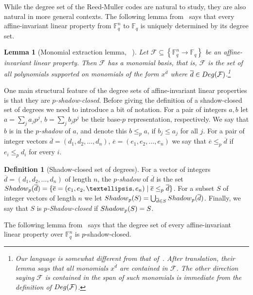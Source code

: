 \documentclass[10pt]{article}
\newtheorem{lemma}[theorem]{Lemma}
\theoremstyle{definition}
\newtheorem{definition}[theorem]{Definition}
\numberwithin{equation}{section}
\newcommand{\F}{{\mathbb{F}}}
\newcommand{\cF}{{\mathcal{F}}}
\newcommand{\set}[1]{\left\{{#1}\right\}}
\newcommand{\Shadow}{{\rm{Shadow}}}
\newcommand{\Deg}{{\rm{Deg}}}
\begin{document}
While the degree set of the Reed-Muller codes are natural to study, they
are also natural in more general contexts.
The following lemma from~\cite{KS08} says that every affine-invariant linear property from $\F_q^n$ to $\F_q$ is uniquely determined by its degree set.

\begin{lemma}[Monomial extraction lemma, {\protect~\cite[Lemma 4.2]{KS08-ECCC}}]\label{lem:monomial-extraction}
Let $\mathcal{F} \subseteq \set{\F_{q}^n \to \F_q}$ be an affine-invariant linear property. Then $\cF$ has a monomial basis, that is, $\cF$ is the set of
all polynomials supported on monomials of the form $x^{\overline d}$ where $\overline d  \in \Deg(\cF)$.\footnote{Our language is somewhat different from that of~\cite{KS08-ECCC}. After
translation, their lemma says that all monomials $x^{\overline d}$
are contained in $\cF$. The other direction saying $\cF$ is contained
in the span of such monomials is immediate from the definition of
$\Deg(\cF)$.}
\end{lemma}

One main structural feature of the degree sets of affine-invariant linear properties is that
they are \emph{$p$-shadow-closed}. Before giving the definition of a shadow-closed set of degrees we need to introduce a bit of notation.
For a pair of integers $a,b$ let
$a= \sum_j a_j p^j$, $b= \sum_j b_jp^j$ be their base-$p$ representation, respectively. We say that $b$ is in the \emph{$p$-shadow} of $a$, and denote this $b \leq_p a$, if $b_j \leq a_j$ for all $j$.
For a pair of integer vectors $ \overline d=(d_1,d_2,\ldots,d_n)$, $\overline e=(e_1,e_2,\ldots,e_n)$ we say that
$\overline e \leq_p  \overline d$ if
$e_i \leq_p d_i$ for every $i$.

\begin{definition}[Shadow-closed set of degrees]\label{defn:shadow-closed}
For a vector of integers $\overline d=(d_1,d_2,\ldots,d_n)$ of length $n$, the \emph{$p$-shadow} of $\overline d$ is the set
$\Shadow_p(\overline d) = \{\overline e=(e_1,e_2,\ldots,e_n) \mid \overline e \leq_p \overline d\}$.
For a subset $S$ of integer vectors  of length $n$ we let
$\Shadow_p(S) = \bigcup_{\overline d \in S} \Shadow_p(\overline d)$.
Finally, we say that $S$ is \emph{$p$-Shadow-closed} if $\Shadow_p(S) = S$.
\end{definition}

The following lemma from~\cite{KS08-ECCC} says that the degree set of every affine-invariant linear property over $\F_q^n$ is $p$-shadow-closed.
\end{document}
